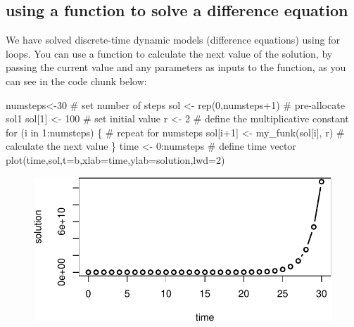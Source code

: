 \documentclass[
  letterpaper,
  DIV=11,
  numbers=noendperiod]{scrreprt}
\newenvironment{Shaded}{\begin{snugshade}}{\end{snugshade}}
\newcommand{\AttributeTok}[1]{\textcolor[rgb]{0.40,0.45,0.13}{#1}}
\newcommand{\CommentTok}[1]{\textcolor[rgb]{0.37,0.37,0.37}{#1}}
\newcommand{\ControlFlowTok}[1]{\textcolor[rgb]{0.00,0.23,0.31}{#1}}
\newcommand{\DecValTok}[1]{\textcolor[rgb]{0.68,0.00,0.00}{#1}}
\newcommand{\FunctionTok}[1]{\textcolor[rgb]{0.28,0.35,0.67}{#1}}
\newcommand{\NormalTok}[1]{\textcolor[rgb]{0.00,0.23,0.31}{#1}}
\newcommand{\OtherTok}[1]{\textcolor[rgb]{0.00,0.23,0.31}{#1}}
\newcommand{\SpecialCharTok}[1]{\textcolor[rgb]{0.37,0.37,0.37}{#1}}
\newcommand{\StringTok}[1]{\textcolor[rgb]{0.13,0.47,0.30}{#1}}
\begin{document}
\hypertarget{using-a-function-to-solve-a-difference-equation}{%
\subsection{using a function to solve a difference
equation}\label{using-a-function-to-solve-a-difference-equation}}

We have solved discrete-time dynamic models (difference equations) using
for loops. You can use a function to calculate the next value of the
solution, by passing the current value and any parameters as inputs to
the function, as you can see in the code chunk below:

\begin{Shaded}
\begin{Highlighting}[]
\NormalTok{numsteps}\OtherTok{\textless{}{-}}\DecValTok{30} \CommentTok{\# set number of steps}
\NormalTok{sol }\OtherTok{\textless{}{-}} \FunctionTok{rep}\NormalTok{(}\DecValTok{0}\NormalTok{,numsteps}\SpecialCharTok{+}\DecValTok{1}\NormalTok{) }\CommentTok{\# pre{-}allocate sol1}
\NormalTok{sol[}\DecValTok{1}\NormalTok{] }\OtherTok{\textless{}{-}} \DecValTok{100} \CommentTok{\# set initial value}
\NormalTok{r }\OtherTok{\textless{}{-}} \DecValTok{2} \CommentTok{\# define the multiplicative constant}
\ControlFlowTok{for}\NormalTok{ (i }\ControlFlowTok{in} \DecValTok{1}\SpecialCharTok{:}\NormalTok{numsteps) \{ }\CommentTok{\# repeat for numsteps}
\NormalTok{  sol[i}\SpecialCharTok{+}\DecValTok{1}\NormalTok{] }\OtherTok{\textless{}{-}} \FunctionTok{my\_funk}\NormalTok{(sol[i], r) }\CommentTok{\# calculate the next value}
\NormalTok{\}}
\NormalTok{time }\OtherTok{\textless{}{-}} \DecValTok{0}\SpecialCharTok{:}\NormalTok{numsteps }\CommentTok{\# define time vector}
\FunctionTok{plot}\NormalTok{(time,sol,}\AttributeTok{t=}\StringTok{\textquotesingle{}b\textquotesingle{}}\NormalTok{,}\AttributeTok{xlab=}\StringTok{\textquotesingle{}time\textquotesingle{}}\NormalTok{,}\AttributeTok{ylab=}\StringTok{\textquotesingle{}solution\textquotesingle{}}\NormalTok{,}\AttributeTok{lwd=}\DecValTok{2}\NormalTok{)}
\end{Highlighting}
\end{Shaded}

\begin{figure}[H]

{\centering \includegraphics{./graph_odes_files/figure-pdf/unnamed-chunk-10-1.pdf}

}

\end{figure}
\end{document}
